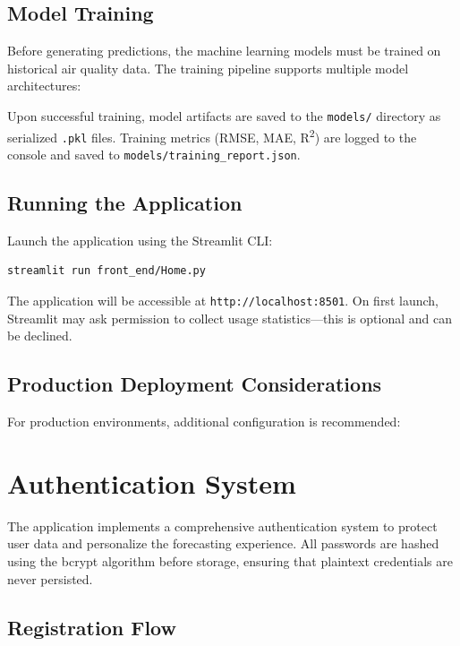 \subsection{Model Training}

Before generating predictions, the machine learning models must be trained on historical air quality data. The training pipeline supports multiple model architectures:


\noindent Upon successful training, model artifacts are saved to the \texttt{models/} directory as serialized \texttt{.pkl} files. Training metrics (RMSE, MAE, R\textsuperscript{2}) are logged to the console and saved to \texttt{models/training\_report.json}.

\subsection{Running the Application}

Launch the application using the Streamlit CLI:

\begin{verbatim}
streamlit run front_end/Home.py
\end{verbatim}

\noindent The application will be accessible at \texttt{http://localhost:8501}. On first launch, Streamlit may ask permission to collect usage statistics---this is optional and can be declined.

\subsection{Production Deployment Considerations}

For production environments, additional configuration is recommended:



\section{Authentication System}
\label{sec:user-auth}

The application implements a comprehensive authentication system to protect user data and personalize the forecasting experience. All passwords are hashed using the bcrypt algorithm before storage, ensuring that plaintext credentials are never persisted.

\subsection{Registration Flow}

